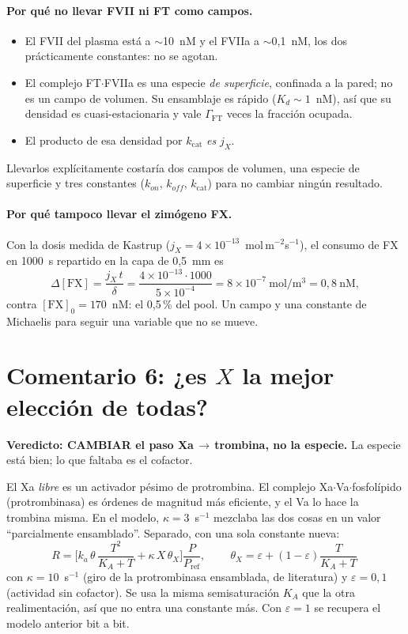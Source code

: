 \documentclass[11pt,a4paper]{article}
\newcommand{\CAMB}{\textcolor{chg}{\textbf{CAMBIAR}}}
\begin{document}
\paragraph{Por qué no llevar FVII ni FT como campos.}
\begin{itemize}[leftmargin=1.2em,itemsep=2pt]
\item El FVII del plasma está a $\sim$10~nM y el FVIIa a $\sim$0{,}1~nM, los dos
prácticamente constantes: no se agotan.
\item El complejo FT$\cdot$FVIIa es una especie \emph{de superficie}, confinada a
la pared; no es un campo de volumen. Su ensamblaje es rápido ($K_d\sim1$~nM), así
que su densidad es cuasi-estacionaria y vale $\Gamma_{\mathrm{FT}}$ veces la
fracción ocupada.
\item El producto de esa densidad por $k_{\mathrm{cat}}$ \emph{es} $j_X$.
\end{itemize}
Llevarlos explícitamente costaría dos campos de volumen, una especie de superficie
y tres constantes ($k_{on}$, $k_{off}$, $k_{\mathrm{cat}}$) para no cambiar ningún
resultado.

\paragraph{Por qué tampoco llevar el zimógeno FX.} Con la dosis medida de Kastrup
($j_X=4\times10^{-13}$~mol\,m$^{-2}$s$^{-1}$), el consumo de FX en 1000~s repartido
en la capa de 0{,}5~mm es
%
\begin{equation}
\Delta[\mathrm{FX}]=\frac{j_X\,t}{\delta}
=\frac{4\times10^{-13}\cdot1000}{5\times10^{-4}}
=8\times10^{-7}\ \mathrm{mol/m^3}=0{,}8\ \mathrm{nM},
\end{equation}
%
contra $[\mathrm{FX}]_0=170$~nM: el 0{,}5\,\% del pool. Un campo y una constante de
Michaelis para seguir una variable que no se mueve.

\section{Comentario 6: ¿es $X$ la mejor elección de todas?}

\textbf{Veredicto: \CAMB{} el paso Xa$\,\to\,$trombina, no la especie.} La especie
está bien; lo que faltaba es el cofactor.

El Xa \emph{libre} es un activador pésimo de protrombina. El complejo
Xa$\cdot$Va$\cdot$fosfolípido (protrombinasa) es órdenes de magnitud más eficiente,
y el Va lo hace la trombina misma. En el modelo, $\kappa=3$~s$^{-1}$ mezclaba las
dos cosas en un valor ``parcialmente ensamblado''. Separado, con una sola constante
nueva:
%
\begin{equation}
R=\Big[k_a\,\theta\,\frac{T^2}{K_A+T}
       +\kappa\,X\,\theta_X\Big]\frac{P}{P_{\mathrm{ref}}},
\qquad
\boxed{\ \theta_X=\varepsilon+(1-\varepsilon)\frac{T}{K_A+T}\ }
\end{equation}
%
con $\kappa=10$~s$^{-1}$ (giro de la protrombinasa ensamblada, de literatura) y
$\varepsilon=0{,}1$ (actividad sin cofactor). Se usa la misma semisaturación $K_A$
que la otra realimentación, así que no entra una constante más. Con
$\varepsilon=1$ se recupera el modelo anterior bit a bit.
\end{document}
